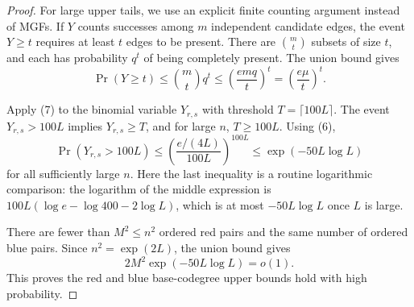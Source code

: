 \begin{proof}
For large upper tails, we use an explicit finite counting argument instead of MGFs. If \(Y\) counts successes among \(m\) independent candidate edges, the event \(Y \ge t\) requires at least \(t\) edges to be present. There are \(\binom{m}{t}\) subsets of size \(t\), and each has probability \(q^t\) of being completely present. The union bound gives
\[
\Pr(Y \ge t) \le \binom{m}{t} q^t \le \left(\frac{emq}{t}\right)^t = \left(\frac{e\mu}{t}\right)^t . \tag{7}
\]

Apply (7) to the binomial variable \(Y_{r,s}\) with threshold
\(T=\lceil 100L\rceil\).  The event \(Y_{r,s}>100L\) implies
\(Y_{r,s}\ge T\), and for large \(n\), \(T\ge100L\).  Using (6),
\[
\Pr(Y_{r,s}>100L)
\le \left(\frac{e/(4L)}{100L}\right)^{100L}
\le \exp(-50L\log L)
\]
for all sufficiently large \(n\).  Here the last inequality is a routine
logarithmic comparison: the logarithm of the middle expression is
\(100L(\log e-\log 400-2\log L)\), which is at most
\(-50L\log L\) once \(L\) is large.

There are fewer than \(M^2\le n^2\) ordered red pairs and the same number of
ordered blue pairs.  Since \(n^2=\exp(2L)\), the union bound gives
\[
2M^2\exp(-50L\log L)=o(1).
\]
This proves the red and blue base-codegree upper bounds hold with high probability.
\end{proof}
